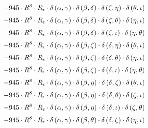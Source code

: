 \begin{subequations}
\begin{gather}
 \\[0.2em] \notag 		 - 945 \cdot R^{8} \cdot R_{\epsilon{}} \cdot \delta{}\left(\alpha{}, \gamma{}\right) \cdot \delta{}\left(\beta{}, \delta{}\right) \cdot \delta{}\left(\zeta{}, \eta{}\right) \cdot \delta{}\left(\theta{}, \iota{}\right) 
 \\[0.2em] \notag 		 - 945 \cdot R^{8} \cdot R_{\epsilon{}} \cdot \delta{}\left(\alpha{}, \gamma{}\right) \cdot \delta{}\left(\beta{}, \delta{}\right) \cdot \delta{}\left(\zeta{}, \theta{}\right) \cdot \delta{}\left(\eta{}, \iota{}\right) 
 \\[0.2em] \notag 		 - 945 \cdot R^{8} \cdot R_{\epsilon{}} \cdot \delta{}\left(\alpha{}, \gamma{}\right) \cdot \delta{}\left(\beta{}, \delta{}\right) \cdot \delta{}\left(\zeta{}, \iota{}\right) \cdot \delta{}\left(\eta{}, \theta{}\right) 
 \\[0.2em] \notag 		 - 945 \cdot R^{8} \cdot R_{\epsilon{}} \cdot \delta{}\left(\alpha{}, \gamma{}\right) \cdot \delta{}\left(\beta{}, \zeta{}\right) \cdot \delta{}\left(\delta{}, \eta{}\right) \cdot \delta{}\left(\theta{}, \iota{}\right) 
 \\[0.2em] \notag 		 - 945 \cdot R^{8} \cdot R_{\epsilon{}} \cdot \delta{}\left(\alpha{}, \gamma{}\right) \cdot \delta{}\left(\beta{}, \zeta{}\right) \cdot \delta{}\left(\delta{}, \theta{}\right) \cdot \delta{}\left(\eta{}, \iota{}\right) 
 \\[0.2em] \notag 		 - 945 \cdot R^{8} \cdot R_{\epsilon{}} \cdot \delta{}\left(\alpha{}, \gamma{}\right) \cdot \delta{}\left(\beta{}, \zeta{}\right) \cdot \delta{}\left(\delta{}, \iota{}\right) \cdot \delta{}\left(\eta{}, \theta{}\right) 
 \\[0.2em] \notag 		 - 945 \cdot R^{8} \cdot R_{\epsilon{}} \cdot \delta{}\left(\alpha{}, \gamma{}\right) \cdot \delta{}\left(\beta{}, \eta{}\right) \cdot \delta{}\left(\delta{}, \zeta{}\right) \cdot \delta{}\left(\theta{}, \iota{}\right) 
 \\[0.2em] \notag 		 - 945 \cdot R^{8} \cdot R_{\epsilon{}} \cdot \delta{}\left(\alpha{}, \gamma{}\right) \cdot \delta{}\left(\beta{}, \eta{}\right) \cdot \delta{}\left(\delta{}, \theta{}\right) \cdot \delta{}\left(\zeta{}, \iota{}\right) 
 \\[0.2em] \notag 		 - 945 \cdot R^{8} \cdot R_{\epsilon{}} \cdot \delta{}\left(\alpha{}, \gamma{}\right) \cdot \delta{}\left(\beta{}, \eta{}\right) \cdot \delta{}\left(\delta{}, \iota{}\right) \cdot \delta{}\left(\zeta{}, \theta{}\right) 
 \\[0.2em] \notag 		 - 945 \cdot R^{8} \cdot R_{\epsilon{}} \cdot \delta{}\left(\alpha{}, \gamma{}\right) \cdot \delta{}\left(\beta{}, \theta{}\right) \cdot \delta{}\left(\delta{}, \zeta{}\right) \cdot \delta{}\left(\eta{}, \iota{}\right) 

\end{gather}
\end{subequations}
